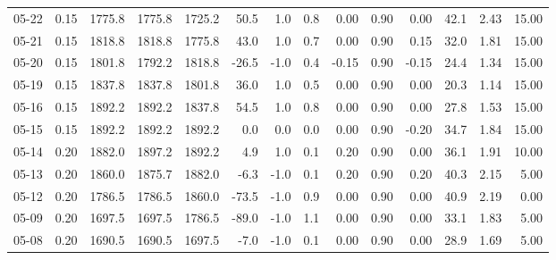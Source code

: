 \begin{threeparttable}
{\begin{tabular}{lrrrrrrrrrrrrr}
  05-22 &     0.15 & 1775.8 & 1775.8 & 1725.2 &       50.5 &                      1.0 &                 0.8 &       0.00 &      0.90 &           0.00 &             42.1 &            2.43 &                  15.00 \\
  05-21 &     0.15 & 1818.8 & 1818.8 & 1775.8 &       43.0 &                      1.0 &                 0.7 &       0.00 &      0.90 &           0.15 &             32.0 &            1.81 &                  15.00 \\
  05-20 &     0.15 & 1801.8 & 1792.2 & 1818.8 &      -26.5 &                     -1.0 &                 0.4 &      -0.15 &      0.90 &          -0.15 &             24.4 &            1.34 &                  15.00 \\
  05-19 &     0.15 & 1837.8 & 1837.8 & 1801.8 &       36.0 &                      1.0 &                 0.5 &       0.00 &      0.90 &           0.00 &             20.3 &            1.14 &                  15.00 \\
  05-16 &     0.15 & 1892.2 & 1892.2 & 1837.8 &       54.5 &                      1.0 &                 0.8 &       0.00 &      0.90 &           0.00 &             27.8 &            1.53 &                  15.00 \\
  05-15 &     0.15 & 1892.2 & 1892.2 & 1892.2 &        0.0 &                      0.0 &                 0.0 &       0.00 &      0.90 &          -0.20 &             34.7 &            1.84 &                  15.00 \\
  05-14 &     0.20 & 1882.0 & 1897.2 & 1892.2 &        4.9 &                      1.0 &                 0.1 &       0.20 &      0.90 &           0.00 &             36.1 &            1.91 &                  10.00 \\
  05-13 &     0.20 & 1860.0 & 1875.7 & 1882.0 &       -6.3 &                     -1.0 &                 0.1 &       0.20 &      0.90 &           0.20 &             40.3 &            2.15 &                   5.00 \\
  05-12 &     0.20 & 1786.5 & 1786.5 & 1860.0 &      -73.5 &                     -1.0 &                 0.9 &       0.00 &      0.90 &           0.00 &             40.9 &            2.19 &                   0.00 \\
  05-09 &     0.20 & 1697.5 & 1697.5 & 1786.5 &      -89.0 &                     -1.0 &                 1.1 &       0.00 &      0.90 &           0.00 &             33.1 &            1.83 &                   5.00 \\
  05-08 &     0.20 & 1690.5 & 1690.5 & 1697.5 &       -7.0 &                     -1.0 &                 0.1 &       0.00 &      0.90 &           0.00 &             28.9 &            1.69 &                   5.00 \\

\end{tabular}}
\end{threeparttable}

